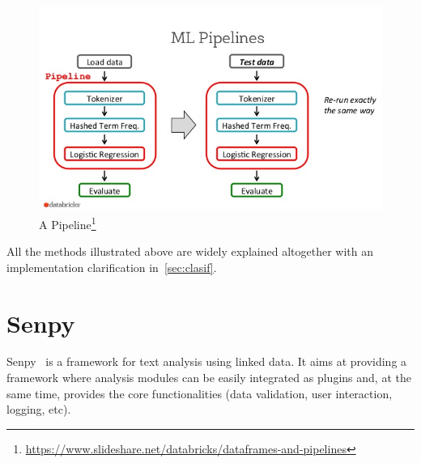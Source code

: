 \begin{figure}
	\centering
	\includegraphics[width=\linewidth]{img/pipeline1.png}
	\caption[Pipeline]{A Pipeline\footnote{\url{https://www.slideshare.net/databricks/dataframes-and-pipelines}}}
	\label{fig:pipeline}
\end{figure}

All the methods illustrated above are widely explained altogether with an implementation clarification in~\cref{sec:clasif}.
\section{Senpy}
Senpy~\cite{senpy} is a framework for text analysis using linked data. It aims at providing a framework where analysis modules can be easily integrated as plugins and, at the same time, provides the core functionalities (data validation, user interaction, logging, etc).

